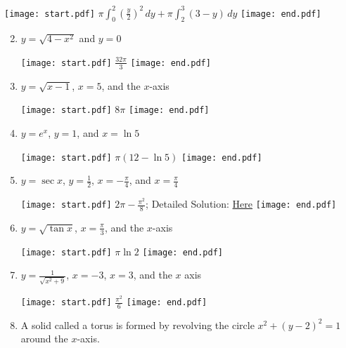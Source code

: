\documentclass[12pt]{article}
\begin{document}
\begin{enumerate}
\begin{enumerate}
\begin{center}
\end{center}

\texttt{[image: start.pdf]}
{{$\pi\int_0^2 \left(\frac{y}{2}\right)^2 \,dy+\pi\int_2^3 (3-y) \,dy$}}
\texttt{[image: end.pdf]}


\end{enumerate}

\end{enumerate}


\begin{enumerate}
\setcounter{enumi}{1}

\item $y=\sqrt{4-x^2}$ and $y=0$

\texttt{[image: start.pdf]}
{{$\frac{32\pi}{3}$}}
\texttt{[image: end.pdf]}


\item $y=\sqrt{x-1}$, $x=5$, and the $x$-axis

\texttt{[image: start.pdf]}
{{$8\pi$}}
\texttt{[image: end.pdf]}


\item $y=e^x$, $y=1$, and $x=\ln{5}$

\texttt{[image: start.pdf]}
{{$\pi(12-\ln{5})$}}
\texttt{[image: end.pdf]}


\item $y=\sec{x}$, $y=\frac{1}{2}$, $x=-\frac{\pi}{4}$, and $x=\frac{\pi}{4}$

\texttt{[image: start.pdf]}
{{$2\pi-\frac{\pi^2}{8}$; Detailed Solution: \textcolor{blue}{\href{http://www.math.drexel.edu/classes/Calculus/resources/Math122HW/Solutions/122_08_Volume_05.pdf}{Here}}}}
\texttt{[image: end.pdf]}


\item $y=\sqrt{\tan{x}}$, $x=\frac{\pi}{3}$, and the $x$-axis

\texttt{[image: start.pdf]}
{{$\pi\ln{2}$}}
\texttt{[image: end.pdf]}


\item $y=\frac{1}{\sqrt{x^2+9}}$, $x=-3$, $x=3$, and the $x$ axis

\texttt{[image: start.pdf]}
{{$\frac{\pi^2}{6}$}}
\texttt{[image: end.pdf]}


\item A solid called a torus is formed by revolving the circle $x^2+(y-2)^2=1$ around the $x$-axis. 


\end{enumerate}
\end{document}
